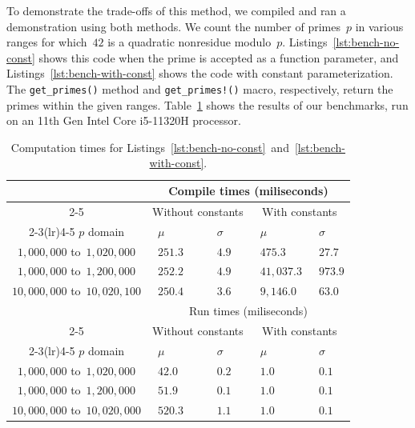 \documentclass{article}
\theoremstyle{definition}
\theoremstyle{remark}
\begin{document}
To demonstrate the trade-offs of this method, we compiled and ran a demonstration using both methods.
We count the number of primes~$p$ in various ranges for which~$42$ is a quadratic nonresidue modulo~$p$.
Listings~\ref{lst:bench-no-const} shows this code when the prime is accepted as a function parameter, and Listings~\ref{lst:bench-with-const} shows the code with constant parameterization.
The \texttt{get\_primes()} method and \texttt{get\_primes!()} macro, respectively, return the primes within the given ranges.
Table~\ref{tbl:benchmarks} shows the results of our benchmarks, run on an 11th Gen Intel Core i5-11320H processor. 

\begin{table}[h]
\begin{center}
    \caption{Computation times for Listings~\ref{lst:bench-no-const}~and~\ref{lst:bench-with-const}.}%
    \label{tbl:benchmarks}
    \begin{tabular}{@{} cp{2cm}p{2cm}p{2cm}p{2cm} @{}}
        \toprule
        & \multicolumn{4}{c}{Compile times (miliseconds)} \\
        \cmidrule(lr){2-5}
        & \multicolumn{2}{c}{Without constants} & \multicolumn{2}{c}{With constants} \\
        \cmidrule(lr){2-3}\cmidrule(lr){4-5}
       $p$ domain &~$\mu$ &~$\sigma$ &~$\mu$ &~$\sigma$ \\
       $1,000,000$ to~$1,020,000$
            &~$251.3$
            &~$4.9$
            &~$475.3$
            &~$27.7$ \\
       $1,000,000$ to~$1,200,000$
            &~$252.2$
            &~$4.9$
            &~$41,037.3$
            &~$973.9$ \\
       $10,000,000$ to~$10,020,100$
            &~$250.4$
            &~$3.6$
            &~$9,146.0$
            &~$63.0$ \\
        & \multicolumn{4}{c}{Run times (miliseconds)} \\
        \cmidrule(lr){2-5}
        & \multicolumn{2}{c}{Without constants} & \multicolumn{2}{c}{With constants} \\
        \cmidrule(lr){2-3}\cmidrule(lr){4-5}
       $p$ domain &~$\mu$ &~$\sigma$ &~$\mu$ &~$\sigma$ \\
       $1,000,000$ to~$1,020,000$
            &~$42.0$
            &~$0.2$
            &~$1.0$
            &~$0.1$ \\
       $1,000,000$ to~$1,200,000$
            &~$51.9$
            &~$0.1$
            &~$1.0$
            &~$0.1$ \\
       $10,000,000$ to~$10,020,000$
            &~$520.3$
            &~$1.1$
            &~$1.0$
            &~$0.1$ \\
        \bottomrule
    \end{tabular}
\end{center}
\end{table}%
\end{document}
